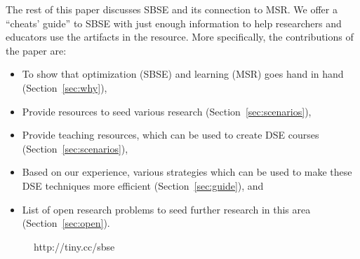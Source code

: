 \documentclass[sigconf,anonymous,review]{acmart}
\begin{document}

The rest of this paper discusses SBSE and its connection to MSR. 
We offer a ``cheats' guide'' to SBSE with just enough information to help researchers and educators use the artifacts in the resource. More specifically, the contributions of the paper are:
\begin{itemize}[leftmargin=*]
    \item To show that optimization (SBSE) and learning (MSR) goes hand in hand (Section~\ref{sec:why}),
    \item Provide resources to seed various research (Section~\ref{sec:scenarios}),
    \item Provide teaching resources, which can be used to create DSE courses (Section~\ref{sec:scenarios}),
    \item Based on our experience, various strategies which can be used to make these DSE techniques more efficient (Section~\ref{sec:guide}), and
    \item List of open research problems to seed further research in this area (Section~\ref{sec:open}). 
\end{itemize}


\begin{figure}[t]
 
{\center
{}}
\caption{http://tiny.cc/sbse}\label{fig:one}
\end{figure}
\end{document}
